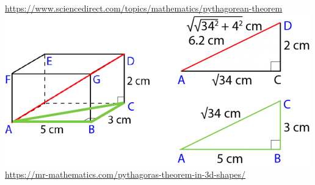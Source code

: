 \begin{frame}
\begin{columns}[T]
\begin{center}
	\url{https://www.sciencedirect.com/topics/mathematics/pythagorean-theorem}
	\includegraphics[width=\linewidth]{./gfx/pythagoras-3d}
	\url{https://mr-mathematics.com/pythagoras-theorem-in-3d-shapes/}
\end{center}
\end{columns}
%
\end{frame}


